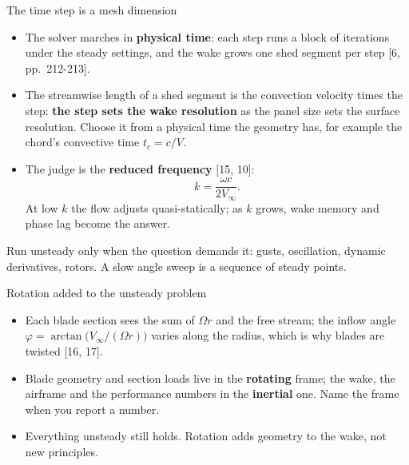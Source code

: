 \begin{frame}{The time step is a mesh dimension}
\begin{itemize}\small
  \item The solver marches in \textbf{physical time}: each step runs a block of
        iterations under the steady settings, and the wake grows one shed
        segment per step [6, pp.~212-213].
  \item The streamwise length of a shed segment is the convection velocity
        times the step: \textbf{the step sets the wake resolution} as the panel
        size sets the surface resolution. Choose it from a physical time the
        geometry has, for example the chord's convective time \(t_c = c/V\).
  \item The judge is the \textbf{reduced frequency} [15, 10]:
        \[ k = \frac{\omega c}{2 V_\infty}. \]
        At low \(k\) the flow adjusts quasi-statically; as \(k\) grows, wake
        memory and phase lag become the answer.
\end{itemize}
\begin{takeaway}Run unsteady only when the question demands it: gusts,
oscillation, dynamic derivatives, rotors. A slow angle sweep is a sequence of
steady points.\end{takeaway}
\end{frame}

\begin{frame}{Rotation added to the unsteady problem}
\begin{itemize}\small
  \item Each blade section sees the sum of \(\Omega r\) and the free stream;
        the inflow angle \(\varphi = \arctan\big(V_\infty / (\Omega r)\big)\)
        varies along the radius, which is why blades are twisted [16, 17].
  \item Blade geometry and section loads live in the \textbf{rotating} frame;
        the wake, the airframe and the performance numbers in the
        \textbf{inertial} one. Name the frame when you report a number.
  \item Everything unsteady still holds. Rotation adds geometry to the wake,
        not new principles.
\end{itemize}
\end{frame}


